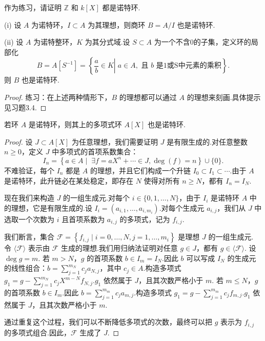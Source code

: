 作为练习，请证明 \(\mathbb{Z}\) 和 \(k\left\lbrack  X\right\rbrack\) 都是诺特环.

\begin{proposition}
(i) 设 \(A\) 为诺特环，\(I \subset  A\) 为其理想，则商环 \(B = A/I\) 也是诺特环.

(ii) 设 \(A\) 为诺特整环，\(K\) 为其分式域.设 \(S \subset A\) 为一个不含0的子集，定义环的局部化
\[
B = A\left\lbrack  {S}^{-1}\right\rbrack   = \left\{  {\left. {\frac{a}{b} \in  K}\right| \; a \in  A, \text{ 且 } b \text{ 是1或S中元素的乘积} }\right\}  .
\]
则 \(B\) 也是诺特环.
\end{proposition}

\begin{proof}
练习：在上述两种情形下，\(B\) 的理想都可以通过 \(A\) 的理想来刻画.具体提示见习题3.4.
\end{proof}

\begin{theorem}[希尔伯特基定理]
若环 \(A\) 是诺特环，则其上的多项式环 \(A\left\lbrack  X\right\rbrack\) 也是诺特环.
\end{theorem}

\begin{proof}
设 \(J \subset  A\left\lbrack  X\right\rbrack\) 为任意理想，我们需要证明 \(J\) 是有限生成的.对任意整数 \(n \geq 0\)，定义 \(J\) 中多项式的首项系数集合：
\[
{I}_{n} = \left\{  {a \in  A\mid {\;\exists f = a{X}^{n} + \cdots \in  J, \deg(f)=n}}\right\} \cup \{0\} .
\]
不难验证，每个 \({I}_{n}\) 都是 \(A\) 的理想，并且它们构成一个升链 \({I}_{0} \subset  {I}_{1} \subset  \cdots\).由于 \(A\) 是诺特环，此升链必在某处稳定，即存在 \(N\) 使得对所有 \(n \geq N\)，都有 \({I}_{n} = {I}_{N}\).

现在我们来构造 \(J\) 的一组生成元.对每个 \(i \in \{0, 1, \ldots, N\}\)，由于 \({I}_{i}\) 是诺特环 \(A\) 中的理想，它是有限生成的.设 \({I}_{i} = ({a}_{i,1},\ldots ,{a}_{i,m_i})\).对每个生成元 \({a}_{i,j}\)，我们从 \(J\) 中选取一个次数为 \(i\) 且首项系数为 \({a}_{i,j}\) 的多项式，记为 \({f}_{i,j}\).

我们断言，集合 \(\mathcal{F} = \left\{  {{f}_{i,j} \mid  i = 0,\ldots ,N, j = 1,\ldots ,{m}_{i}}\right\}\) 是理想 \(J\) 的一组生成元.
令 \(\langle\mathcal{F}\rangle\) 表示由 \(\mathcal{F}\) 生成的理想.我们用归纳法证明对任意 \(g \in J\)，都有 \(g \in \langle\mathcal{F}\rangle\).
设 \(\deg g = m\).
若 \(m > N\)，\(g\) 的首项系数 \(b \in I_m = I_N\).因此 \(b\) 可以写成 \(I_N\) 的生成元的线性组合：\(b = \sum_{j=1}^{m_N} c_j a_{N,j}\)，其中 \(c_j \in A\).构造多项式 \(g_1 = g - \sum_{j=1}^{m_N} c_j X^{m-N} f_{N,j}\).\(g_1\) 依然属于 \(J\)，且其次数严格小于 \(m\).
若 \(m \leq N\)，\(g\) 的首项系数 \(b \in I_m\).因此 \(b = \sum_{j=1}^{m_m} c_j a_{m,j}\).构造多项式 \(g_1 = g - \sum_{j=1}^{m_m} c_j f_{m,j}\).\(g_1\) 依然属于 \(J\)，且其次数严格小于 \(m\).

通过重复这个过程，我们可以不断降低多项式的次数，最终可以把 \(g\) 表示为 \({f}_{i,j}\) 的多项式组合.因此，\(\mathcal{F}\) 生成了 \(J\).
\end{proof}

